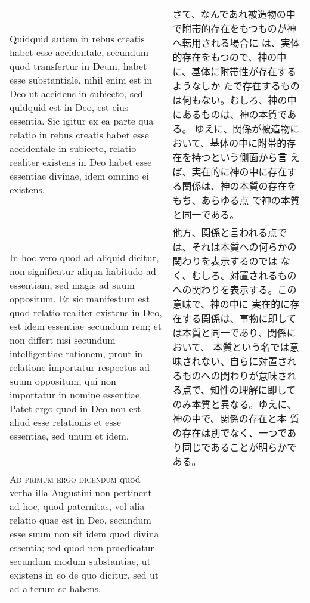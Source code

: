 \documentclass[10pt]{jsarticle} %
\begin{document}
\begin{longtable}{p{21em}p{21em}}
\\



Quidquid
autem in rebus creatis habet esse accidentale, secundum quod transfertur
in Deum, habet esse substantiale, nihil enim est in Deo ut accidens in
subiecto, sed quidquid est in Deo, est eius essentia. Sic igitur ex ea
parte qua relatio in rebus creatis habet esse accidentale in subiecto,
relatio realiter existens in Deo habet esse essentiae divinae, idem
omnino ei existens. 



&

さて、なんであれ被造物の中で附帯的存在をもつものが神へ転用される場合に
 は、実体的存在をもつので、神の中に、基体に附帯性が存在するようなしか
 たで存在するものは何もない。むしろ、神の中にあるものは、神の本質である。
ゆえに、関係が被造物において、基体の中に附帯的存在を持つという側面から言
 えば、実在的に神の中に存在する関係は、神の本質の存在をもち、あらゆる点
 で神の本質と同一である。

\\


In hoc vero quod ad aliquid dicitur, non
significatur aliqua habitudo ad essentiam, sed magis ad suum
oppositum. Et sic manifestum est quod relatio realiter existens in Deo,
est idem essentiae secundum rem; et non differt nisi secundum
intelligentiae rationem, prout in relatione importatur respectus ad suum
oppositum, qui non importatur in nomine essentiae. Patet ergo quod in
Deo non est aliud esse relationis et esse essentiae, sed unum et idem.


&

他方、関係と言われる点では、それは本質への何らかの関わりを表示するのでは
 なく、むしろ、対置されるものへの関わりを表示する。この意味で、神の中に
 実在的に存在する関係は、事物に即しては本質と同一であり、関係において、
 本質という名では意味されない、自らに対置されるものへの関わりが意味され
 る点で、知性の理解に即してのみ本質と異なる。ゆえに、神の中で、関係の存在と本
 質の存在は別でなく、一つであり同じであることが明らかである。

\\



{\scshape Ad primum ergo dicendum} quod verba illa Augustini non pertinent ad hoc,
quod paternitas, vel alia relatio quae est in Deo, secundum esse suum
non sit idem quod divina essentia; sed quod non praedicatur secundum
modum substantiae, ut existens in eo de quo dicitur, sed ut ad alterum
se habens. 



\end{longtable}
\end{document}

